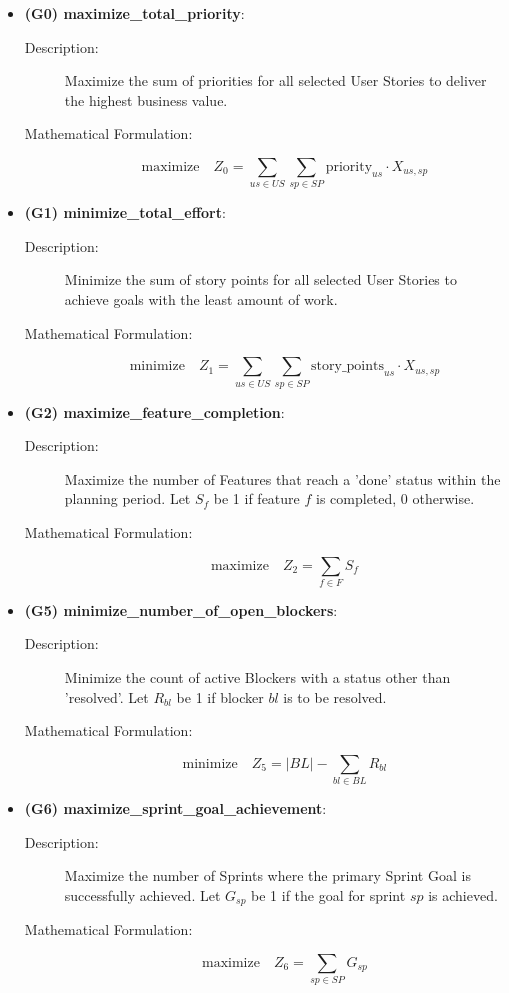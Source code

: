 \documentclass[11pt]{article}
\begin{document}
\begin{itemize}
    \item \textbf{(G0) maximize\_total\_priority}:
    \begin{description}
        \item[Description:] Maximize the sum of priorities for all selected User Stories to deliver the highest business value.
        \item[Mathematical Formulation:]
        $$ \text{maximize} \quad Z_0 = \sum_{us \in US} \sum_{sp \in SP} \text{priority}_{us} \cdot X_{us, sp} $$
    \end{description}

    \item \textbf{(G1) minimize\_total\_effort}:
    \begin{description}
        \item[Description:] Minimize the sum of story points for all selected User Stories to achieve goals with the least amount of work.
        \item[Mathematical Formulation:]
        $$ \text{minimize} \quad Z_1 = \sum_{us \in US} \sum_{sp \in SP} \text{story\_points}_{us} \cdot X_{us, sp} $$
    \end{description}

    \item \textbf{(G2) maximize\_feature\_completion}:
    \begin{description}
        \item[Description:] Maximize the number of Features that reach a 'done' status within the planning period. Let $S_{f}$ be 1 if feature $f$ is completed, 0 otherwise.
        \item[Mathematical Formulation:]
        $$ \text{maximize} \quad Z_2 = \sum_{f \in F} S_{f} $$
    \end{description}

    \item \textbf{(G5) minimize\_number\_of\_open\_blockers}:
    \begin{description}
        \item[Description:] Minimize the count of active Blockers with a status other than 'resolved'. Let $R_{bl}$ be 1 if blocker $bl$ is to be resolved.
        \item[Mathematical Formulation:]
        $$ \text{minimize} \quad Z_5 = |BL| - \sum_{bl \in BL} R_{bl} $$
    \end{description}
    
    \item \textbf{(G6) maximize\_sprint\_goal\_achievement}:
    \begin{description}
        \item[Description:] Maximize the number of Sprints where the primary Sprint Goal is successfully achieved. Let $G_{sp}$ be 1 if the goal for sprint $sp$ is achieved.
        \item[Mathematical Formulation:]
        $$ \text{maximize} \quad Z_6 = \sum_{sp \in SP} G_{sp} $$
    \end{description}
\end{itemize}
\end{document}
